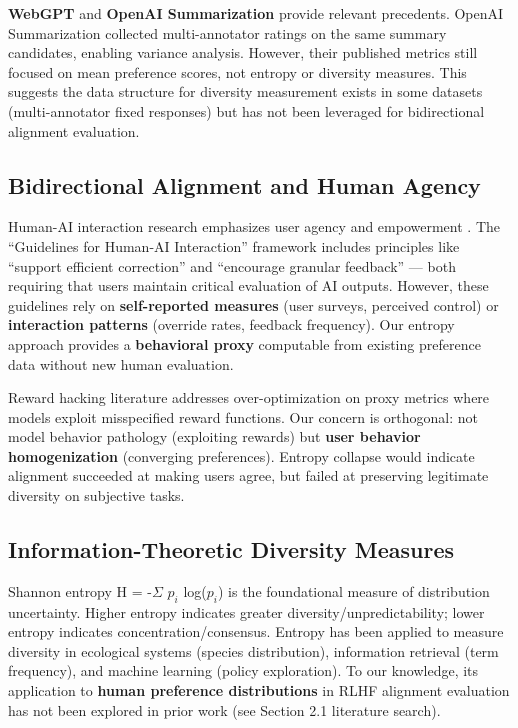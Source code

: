 \textbf{WebGPT} \cite{nakano2021webgpt} and \textbf{OpenAI Summarization} \cite{stiennon2020summarize} provide relevant precedents. OpenAI Summarization collected multi-annotator ratings on the same summary candidates, enabling variance analysis. However, their published metrics still focused on mean preference scores, not entropy or diversity measures. This suggests the data structure for diversity measurement exists in some datasets (multi-annotator fixed responses) but has not been leveraged for bidirectional alignment evaluation.

\subsection{Bidirectional Alignment and Human Agency}

Human-AI interaction research emphasizes user agency and empowerment \cite{amershi2019guidelines}. The ``Guidelines for Human-AI Interaction'' framework includes principles like ``support efficient correction'' and ``encourage granular feedback'' — both requiring that users maintain critical evaluation of AI outputs. However, these guidelines rely on \textbf{self-reported measures} (user surveys, perceived control) or \textbf{interaction patterns} (override rates, feedback frequency). Our entropy approach provides a \textbf{behavioral proxy} computable from existing preference data without new human evaluation.

Reward hacking literature \cite{skalse2022misalignment} addresses over-optimization on proxy metrics where models exploit misspecified reward functions. Our concern is orthogonal: not model behavior pathology (exploiting rewards) but \textbf{user behavior homogenization} (converging preferences). Entropy collapse would indicate alignment succeeded at making users agree, but failed at preserving legitimate diversity on subjective tasks.

\subsection{Information-Theoretic Diversity Measures}

Shannon entropy \cite{shannon1948information} H = -$\Sigma$ $p_i$ log($p_i$) is the foundational measure of distribution uncertainty. Higher entropy indicates greater diversity/unpredictability; lower entropy indicates concentration/consensus. Entropy has been applied to measure diversity in ecological systems (species distribution), information retrieval (term frequency), and machine learning (policy exploration). To our knowledge, its application to \textbf{human preference distributions} in RLHF alignment evaluation has not been explored in prior work (see Section 2.1 literature search).


